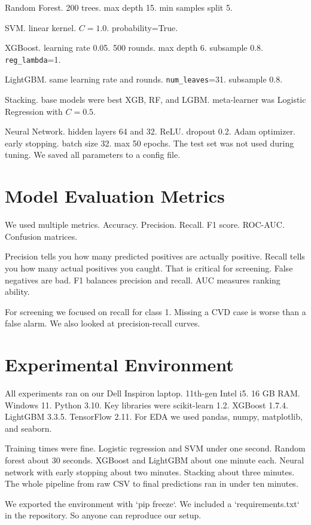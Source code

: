 \documentclass[12pt, a4paper, oneside]{book}
\begin{document}
Random Forest. 200 trees. max depth 15. min samples split 5.

SVM. linear kernel. $C=1.0$. probability=True.

XGBoost. learning rate 0.05. 500 rounds. max depth 6. subsample 0.8. \texttt{reg\_lambda}=1.

LightGBM. same learning rate and rounds. \texttt{num\_leaves}=31. subsample 0.8.

Stacking. base models were best XGB, RF, and LGBM. meta-learner was Logistic Regression with $C=0.5$.

Neural Network. hidden layers 64 and 32. ReLU. dropout 0.2. Adam optimizer. early stopping. batch size 32. max 50 epochs.
The test set was not used during tuning. We saved all parameters to a config file.

\section{Model Evaluation Metrics}
We used multiple metrics. Accuracy. Precision. Recall. F1 score. ROC-AUC. Confusion matrices.

Precision tells you how many predicted positives are actually positive. Recall tells you how many actual positives you caught. That is critical for screening. False negatives are bad. F1 balances precision and recall. AUC measures ranking ability.

For screening we focused on recall for class 1. Missing a CVD case is worse than a false alarm. We also looked at precision-recall curves.

\section{Experimental Environment}
All experiments ran on our Dell Inspiron laptop. 11th-gen Intel i5. 16 GB RAM. Windows 11. Python 3.10. Key libraries were scikit-learn 1.2. XGBoost 1.7.4. LightGBM 3.3.5. TensorFlow 2.11. For EDA we used pandas, numpy, matplotlib, and seaborn.

Training times were fine. Logistic regression and SVM under one second. Random forest about 30 seconds. XGBoost and LightGBM about one minute each. Neural network with early stopping about two minutes. Stacking about three minutes. The whole pipeline from raw CSV to final predictions ran in under ten minutes.

We exported the environment with `pip freeze`. We included a `requirements.txt` in the repository. So anyone can reproduce our setup.
\end{document}
